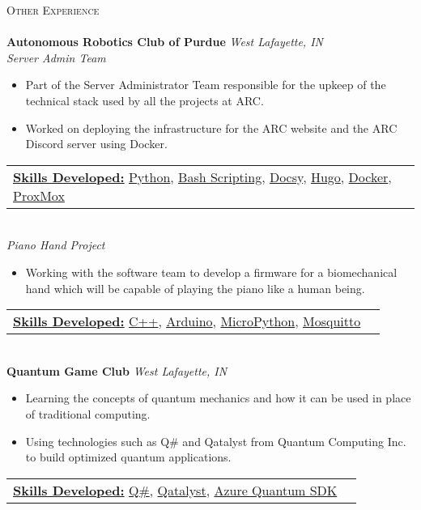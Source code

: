 \documentclass[a4paper]{article}
\newcommand{\lineunder} {
    \vspace*{-8pt} \\
    \hspace*{-18pt} \hrulefill \\
}
\newcommand{\header} [1] {
    {\hspace*{-18pt}\vspace*{6pt} \textsc{#1}}
    \vspace*{-6pt} \lineunder
}
\begin{document}
\header{Other Experience}
{\textbf{Autonomous Robotics Club of Purdue}} \hfill \textit {West Lafayette, IN}\\
\textit{Server Admin Team} 
\vspace{-1mm}
\begin{itemize} \itemsep 1pt
    \item Part of the Server Administrator Team responsible for the upkeep of the technical stack used by all the projects at ARC.
    \item Worked on deploying the infrastructure for the ARC website and the ARC Discord server using Docker.
\end{itemize}
\begin{tabular}{ l l }
    \underline{\textbf {Skills Developed:}} \href{https://www.python.org/}{Python}, \href{https://www.gnu.org/software/bash/}{Bash Scripting}, \href{https://www.docsy.dev/}{Docsy}, \href{https://gohugo.io/about/what-is-hugo/}{Hugo}, \href{https://www.docker.com/}{Docker}, \href{https://www.proxmox.com/en/}{ProxMox}
\end{tabular} \\
\vspace{2mm}
\textit{Piano Hand Project}
\vspace{-1mm}
\begin{itemize} \itemsep 1pt
    \item Working with the software team to develop a firmware for a biomechanical hand which will be capable of playing the piano like a human being.
\end{itemize}
\begin{tabular}{ l l }
    \underline{\textbf {Skills Developed:}} \href{https://cplusplus.com/}{C++}, \href{https://www.arduino.cc/}{Arduino}, \href{https://micropython.org/}{MicroPython}, \href{https://mosquitto.org/}{Mosquitto}
\end{tabular} \\
\vspace{2mm}
\textbf{Quantum Game Club} \hfill \textit {West Lafayette, IN}\\
\vspace{-1mm}
\begin{itemize}
    \item Learning the concepts of quantum mechanics and how it can be used in place of traditional computing. 
    \item Using technologies such as Q\# and Qatalyst from Quantum Computing Inc. to build optimized quantum applications.
\end{itemize}
\begin{tabular}{ l l }
    \underline {\textbf {Skills Developed:}} \href{https://github.com/microsoft/qsharp-language}{Q\#}, \href{https://www.quantum-computing.com/}{Qatalyst}, \href{https://azure.microsoft.com/en-us/services/quantum/}{Azure Quantum SDK}
\end{tabular} \\
\vspace*{2mm}
\end{document}
